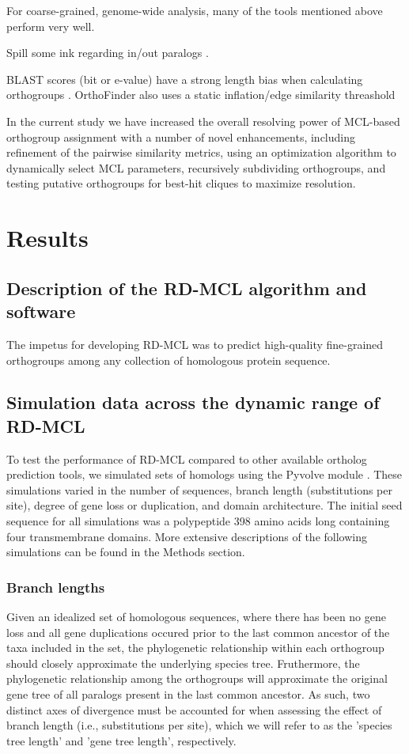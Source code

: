 \documentclass[twocolumn]{bmcart}%
\begin{document}
For coarse-grained, genome-wide analysis, many of the tools mentioned above perform very well.

Spill some ink regarding in/out paralogs \cite{Sonnhammer:2002vm,Tekaia:2016ga}.

BLAST scores (bit or e-value) have a strong length bias when calculating orthogroups \cite{Emms:2015ig}. OrthoFinder also uses a static inflation/edge similarity threashold \cite{Emms:2015ig}

In the current study we have increased the overall resolving power of MCL-based orthogroup assignment with a number of novel enhancements, including refinement of the pairwise similarity metrics, using an optimization algorithm to dynamically select MCL parameters, recursively subdividing orthogroups, and testing putative orthogroups for best-hit cliques to maximize resolution.


\section{Results}
\subsection{Description of the RD-MCL algorithm and software}
The impetus for developing RD-MCL was to predict high-quality fine-grained orthogroups among any collection of homologous protein sequence.

\lipsum[3]

\subsection{Simulation data across the dynamic range of RD-MCL}
To test the performance of RD-MCL compared to other available ortholog prediction tools, we simulated sets of homologs using the Pyvolve module \cite{Spielman:2015kv}. These simulations varied in the number of sequences, branch length (substitutions per site), degree of gene loss or duplication, and domain architecture. The initial seed sequence for all simulations was a polypeptide 398 amino acids long containing four transmembrane domains. More extensive descriptions of the following simulations can be found in the Methods section.

\subsubsection{Branch lengths}
Given an idealized set of homologous sequences, where there has been no gene loss and all gene duplications occured prior to the last common ancestor of the taxa included in the set, the phylogenetic relationship within each orthogroup should closely approximate the underlying species tree. Fruthermore, the phylogenetic relationship among the orthogroups will approximate the original gene tree of all paralogs present in the last common ancestor. As such, two distinct axes of divergence must be accounted for when assessing the effect of branch length (i.e., substitutions per site), which we will refer to as the 'species tree length' and 'gene tree length', respectively.
\end{document}
